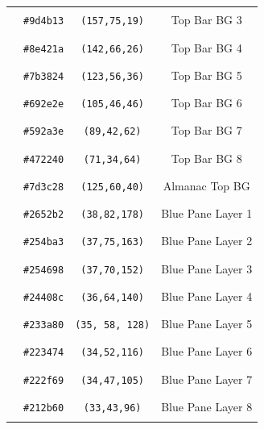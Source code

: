 \documentclass[a4paper,11pt]{refart}
\begin{document}
\begin{centering}
\begin{longtabu}{cccc}
  \textcolor[cmyk]{0, 0.5223, 0.8790, 0.3843}{\rule{.1\textwidth}{12pt}}  & \texttt{\#9d4b13}    & \texttt{(157,75,19)} & Top Bar BG 3 \\
  \textcolor[cmyk]{0, 0.5352, 0.8169, 0.4431}{\rule{.1\textwidth}{12pt}}  & \texttt{\#8e421a}    & \texttt{(142,66,26)} & Top Bar BG 4 \\
  \textcolor[cmyk]{0, 0.5447, 0.7073, 0.5176}{\rule{.1\textwidth}{12pt}}  & \texttt{\#7b3824}    & \texttt{(123,56,36)} & Top Bar BG 5 \\
  \textcolor[cmyk]{0, 0.5619, 0.5619, 0.5882}{\rule{.1\textwidth}{12pt}}  & \texttt{\#692e2e}    & \texttt{(105,46,46)} & Top Bar BG 6 \\
  \textcolor[cmyk]{0, 0.5281, 0.3034, 0.6510}{\rule{.1\textwidth}{12pt}}  & \texttt{\#592a3e}    & \texttt{(89,42,62)} & Top Bar BG 7 \\
  \textcolor[cmyk]{0, 0.5211, 0.0986, 0.7216}{\rule{.1\textwidth}{12pt}}  & \texttt{\#472240}    & \texttt{(71,34,64)} & Top Bar BG 8 \\
  \textcolor[cmyk]{0, 0.5200, 0.6800, 0.5098}{\rule{.1\textwidth}{12pt}}  & \texttt{\#7d3c28}    & \texttt{(125,60,40)} & Almanac Top BG \\
  \textcolor[cmyk]{0.7865, 0.5393, 0, 0.3020}{\rule{.1\textwidth}{12pt}}  & \texttt{\#2652b2}    & \texttt{(38,82,178)} & Blue Pane Layer 1 \\
  \textcolor[cmyk]{0.7730, 0.5399, 0, 0.3608}{\rule{.1\textwidth}{12pt}}  & \texttt{\#254ba3}    & \texttt{(37,75,163)} & Blue Pane Layer 2 \\
  \textcolor[cmyk]{0.7566, 0.5395, 0, 0.4039}{\rule{.1\textwidth}{12pt}}  & \texttt{\#254698}    & \texttt{(37,70,152)} & Blue Pane Layer 3 \\
  \textcolor[cmyk]{0.7429, 0.5429, 0, 0.4510}{\rule{.1\textwidth}{12pt}}  & \texttt{\#24408c}    & \texttt{(36,64,140)} & Blue Pane Layer 4 \\
  \textcolor[cmyk]{0.7266, 0.5469, 0, 0.4980}{\rule{.1\textwidth}{12pt}}  & \texttt{\#233a80}    & \texttt{(35, 58, 128)} & Blue Pane Layer 5 \\
  \textcolor[cmyk]{0.7069, 0.5517, 0, 0.5451}{\rule{.1\textwidth}{12pt}}  & \texttt{\#223474}    & \texttt{(34,52,116)} & Blue Pane Layer 6 \\
  \textcolor[cmyk]{0.6762, 0.5524, 0, 0.5882}{\rule{.1\textwidth}{12pt}}  & \texttt{\#222f69}    & \texttt{(34,47,105)} & Blue Pane Layer 7 \\
  \textcolor[cmyk]{0.6563, 0.5521, 0, 0.6235}{\rule{.1\textwidth}{12pt}}  & \texttt{\#212b60}    & \texttt{(33,43,96)} & Blue Pane Layer 8 \\

\end{longtabu}
\end{centering}
\end{document}
